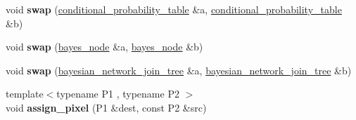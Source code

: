 \begin{DoxyCompactItemize}
\item 
\hypertarget{namespacedlib_a8b27c914488b4014e5719374d7318d9f}{
void {\bfseries swap} (\hyperlink{classdlib_1_1conditional__probability__table}{conditional\_\-probability\_\-table} \&a, \hyperlink{classdlib_1_1conditional__probability__table}{conditional\_\-probability\_\-table} \&b)}
\label{namespacedlib_a8b27c914488b4014e5719374d7318d9f}

\item 
\hypertarget{namespacedlib_a7bcc46f1847648e253d66802ef05272f}{
void {\bfseries swap} (\hyperlink{classdlib_1_1bayes__node}{bayes\_\-node} \&a, \hyperlink{classdlib_1_1bayes__node}{bayes\_\-node} \&b)}
\label{namespacedlib_a7bcc46f1847648e253d66802ef05272f}

\item 
\hypertarget{namespacedlib_a61b07f424fd7415b61689a8fbdda9857}{
void {\bfseries swap} (\hyperlink{classdlib_1_1bayesian__network__join__tree}{bayesian\_\-network\_\-join\_\-tree} \&a, \hyperlink{classdlib_1_1bayesian__network__join__tree}{bayesian\_\-network\_\-join\_\-tree} \&b)}
\label{namespacedlib_a61b07f424fd7415b61689a8fbdda9857}

\item 
\hypertarget{namespacedlib_a8d76ef041038ff39aa6660f4764ea60d}{
{\footnotesize template$<$typename P1 , typename P2 $>$ }\\void {\bfseries assign\_\-pixel} (P1 \&dest, const P2 \&src)}
\label{namespacedlib_a8d76ef041038ff39aa6660f4764ea60d}


\end{DoxyCompactItemize}

